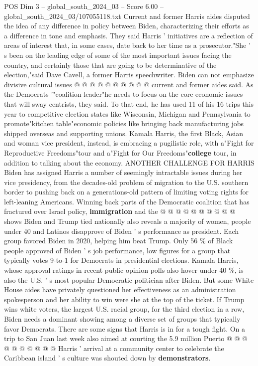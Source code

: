 \begin{textsample}{POS Dim 3 – global\_south\_2024\_03 – Score 6.00 – global\_south\_2024\_03/107055118.txt}
Current and former Harris aides disputed the idea of any difference in policy between Biden, characterizing their efforts as a difference in tone and emphasis.
They said Harris ' initiatives are a reflection of areas of interest that, in some cases, date back to her time as a prosecutor."She ' s been on the leading edge of some of the most important issues facing the country, and certainly those that are going to be determinative of the election,"said Dave Cavell, a former Harris speechwriter.
Biden can not emphasize divisive cultural issues @ @ @ @ @ @ @ @ @ @ current and former aides said.
As the Democrats '"coalition leader"he needs to focus on the core economic issues that will sway centrists, they said.
To that end, he has used 11 of his 16 trips this year to competitive election states like Wisconsin, Michigan and Pennsylvania to promote"kitchen table"economic policies like bringing back manufacturing jobs shipped overseas and supporting unions.
Kamala Harris, the first Black, Asian and woman vice president, instead, is embracing a pugilistic role, with a"Fight for Reproductive Freedoms"tour and a"Fight for Our Freedoms"\textbf{college} tour, in addition to talking about the economy.
ANOTHER CHALLENGE FOR HARRIS Biden has assigned Harris a number of seemingly intractable issues during her vice presidency, from the decades-old problem of migration to the U.S. southern border to pushing back on a generations-old pattern of limiting voting rights for left-leaning Americans.
Winning back parts of the Democratic coalition that has fractured over Israel policy, \textbf{immigration} and the @ @ @ @ @ @ @ @ @ @ shows Biden and Trump tied nationally also reveals a majority of women, people under 40 and Latinos disapprove of Biden ' s performance as president.
Each group favored Biden in 2020, helping him beat Trump.
Only 56 \% of Black people approved of Biden ' s job performance, low figures for a group that typically votes 9-to-1 for Democrats in presidential elections.
Kamala Harris, whose approval ratings in recent public opinion polls also hover under 40 \%, is also the U.S. ' s most popular Democratic politician after Biden.
But some White House aides have privately questioned her effectiveness as an administration spokesperson and her ability to win were she at the top of the ticket.
If Trump wins white voters, the largest U.S. racial group, for the third election in a row, Biden needs a dominant showing among a diverse set of groups that typically favor Democrats.
There are some signs that Harris is in for a tough fight.
On a trip to San Juan last week also aimed at courting the 5.9 million Puerto @ @ @ @ @ @ @ @ @ @ Harris ' arrival at a community center to celebrate the Caribbean island ' s culture was shouted down by \textbf{demonstrators}.

\end{textsample}
